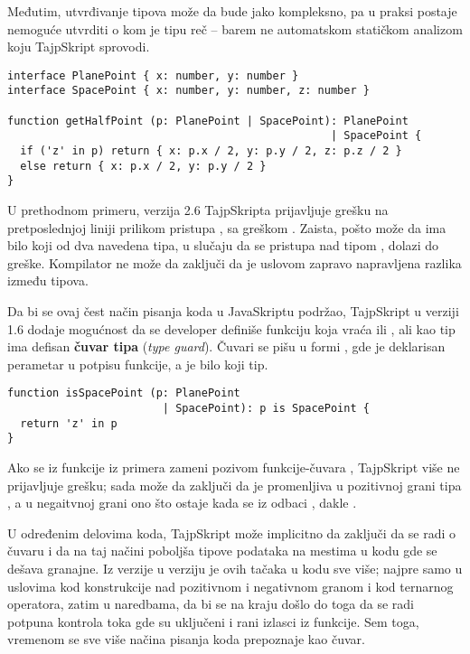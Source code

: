 Međutim, utvrđivanje tipova može da bude jako kompleksno, pa u praksi postaje nemoguće utvrditi o kom je tipu reč -- barem ne automatskom statičkom analizom koju TajpSkript sprovodi.

\begin{verbatim}
interface PlanePoint { x: number, y: number }
interface SpacePoint { x: number, y: number, z: number }

function getHalfPoint (p: PlanePoint | SpacePoint): PlanePoint
                                                  | SpacePoint {
  if ('z' in p) return { x: p.x / 2, y: p.y / 2, z: p.z / 2 }
  else return { x: p.x / 2, y: p.y / 2 }
}
\end{verbatim}

U prethodnom primeru, verzija 2.6 TajpSkripta prijavljuje grešku na pretposlednjoj liniji prilikom pristupa , sa greškom .
Zaista, pošto  može da ima bilo koji od dva navedena tipa, u slučaju da se pristupa  nad tipom , dolazi do greške.
Kompilator ne može da zaključi da je uslovom  zapravo napravljena razlika između tipova.

Da bi se ovaj čest način pisanja koda u JavaSkriptu podržao, TajpSkript u verziji 1.6 dodaje mogućnost da se developer definiše funkciju koja vraća  ili , ali kao tip ima defisan \textbf{čuvar tipa} (\textsl{type guard}).
Čuvari se pišu u formi , gde je  deklarisan perametar u potpisu funkcije, a  je bilo koji tip.

\begin{verbatim}
function isSpacePoint (p: PlanePoint
                        | SpacePoint): p is SpacePoint {
  return 'z' in p
}
\end{verbatim}

Ako se  iz funkcije  iz primera zameni pozivom funkcije-čuvara , TajpSkript više ne prijavljuje grešku; sada može da zaključi da je promenljiva  u pozitivnoj grani tipa , a u negaitvnoj grani ono što ostaje kada se iz  odbaci , dakle .

U određenim delovima koda, TajpSkript može implicitno da zaključi da se radi o čuvaru i da na taj načini poboljša tipove podataka na mestima u kodu gde se dešava granajne.
Iz verzije u verziju je ovih tačaka u kodu sve više; najpre samo u uslovima kod  konstrukcije nad pozitivnom i negativnom granom i kod ternarnog operatora, zatim u  naredbama, da bi se na kraju došlo do toga da se radi potpuna kontrola toka gde su uključeni i rani izlasci iz funkcije.
Sem toga, vremenom se sve više načina pisanja koda prepoznaje kao čuvar.

